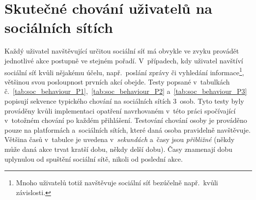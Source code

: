 \section{Skutečné chování uživatelů na sociálních sítích}
Každý uživatel navštěvující určitou sociální síť má obvykle ve zvyku provádět jednotlivé akce postupně ve stejném pořadí. V~případech, kdy uživatel navštíví sociální síť kvůli nějakému účelu, např.~poslání zprávy či vyhledání informace\footnote{Mnoho uživatelů totiž navštěvuje sociální síť bezúčelně např.~kvůli závislosti.}, většinou svou posloupnost prvních akcí obejde. Testy popsané v~tabulkách č.~\ref{tab:soc_behaviour_P1},~\ref{tab:soc_behaviour_P2} a~\ref{tab:soc_behaviour_P3} popisují sekvence typického chování na sociálních sítích 3~osob. Tyto testy byly prováděny kvůli implementaci opatření navrhovaném v~této práci spočívající v~totožném chování po každém přihlášení. Testování chování osoby je prováděno pouze na platformách a~sociálních sítích, které daná osoba pravidelně navštěvuje. Většina časů v~tabulce je uvedena v~\textit{sekundách} a~časy jsou \textit{přibližné} (někdy může daná akce trvat kratší dobu, někdy delší dobu). Časy znamenají dobu uplynulou od spuštění sociální sítě, nikoli od poslední akce.


